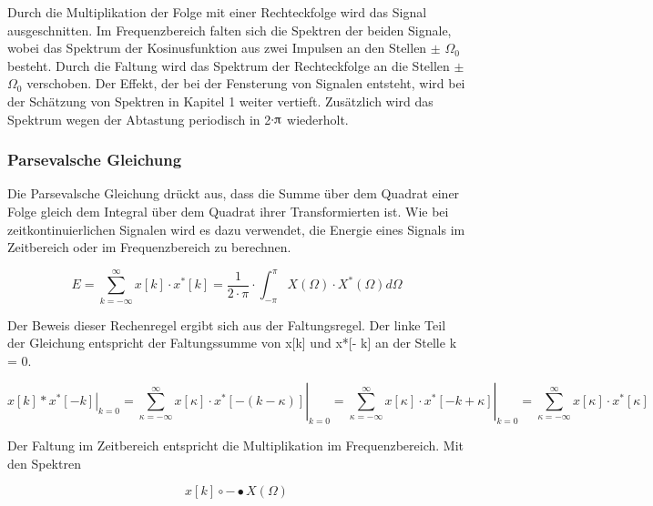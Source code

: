 \noindent Durch die Multiplikation der Folge mit einer Rechteckfolge wird das Signal ausgeschnitten. Im Frequenzbereich falten sich die Spektren der beiden Signale, wobei das Spektrum der Kosinusfunktion aus zwei Impulsen an den Stellen $\mathrm{\pm}$ $\Omega_{0}$ besteht. Durch die Faltung wird das Spektrum der Rechteckfolge an die Stellen $\mathrm{\pm}$ $\Omega_{0}$ verschoben. Der Effekt, der bei der Fensterung von Signalen entsteht, wird bei der Sch\"{a}tzung von Spektren in Kapitel 1 weiter vertieft. Zus\"{a}tzlich wird das Spektrum wegen der Abtastung periodisch in 2$\cdot\piup$ wiederholt.

\subsubsection{Parsevalsche Gleichung}

\noindent Die Parsevalsche Gleichung dr\"{u}ckt aus, dass die Summe \"{u}ber dem Quadrat einer Folge gleich dem Integral \"{u}ber dem Quadrat ihrer Transformierten ist. Wie bei zeitkontinuierlichen Signalen wird es dazu verwendet, die Energie eines Signals im Zeitbereich oder im Frequenzbereich zu berechnen.

\begin{equation}\label{eq:sevenseightysix}
E=\sum _{k=-\infty }^{\infty }x\left[k\right]\cdot x^{*} \left[k\right] =\frac{1}{2\cdot \pi } \cdot \int _{-\pi }^{\pi }X\left(\Omega \right)\cdot X^{*} \left(\Omega \right)d\Omega
\end{equation}

\noindent Der Beweis dieser Rechenregel ergibt sich aus der Faltungsregel. Der linke Teil der Gleichung entspricht der Faltungssumme von x[k] und x*[- k] an der Stelle k = 0.

\begin{equation}\label{eq:sevenseightyseven}
\left. x\left[k\right]*x^{*} \left[-k\right]\right|_{k=0} =\left. \sum _{\kappa =-\infty }^{\infty }x\left[\kappa \right]\cdot x^{*} \left[-\left(k-\kappa \right)\right] \right|_{k=0} =\left. \sum _{\kappa =-\infty }^{\infty }x\left[\kappa \right]\cdot x^{*} \left[-k+\kappa \right] \right|_{k=0} =\sum _{\kappa =-\infty }^{\infty }x\left[\kappa \right]\cdot x^{*} \left[\kappa \right]
\end{equation}

\noindent Der Faltung im Zeitbereich entspricht die Multiplikation im Frequenzbereich. Mit den Spektren

\begin{equation}\label{eq:sevenseightyeight}
x\left[k\right]\circ -\bullet X\left(\Omega \right)
\end{equation}

